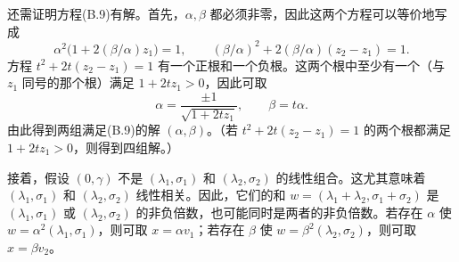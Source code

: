 还需证明方程(B.9)有解。首先，$\alpha,\beta$ 都必须非零，因此这两个方程可以等价地写成
\[
 \alpha^2\bigl(1+2(\beta/\alpha)z_1\bigr)=1,\qquad
 (\beta/\alpha)^2+2(\beta/\alpha)(z_2-z_1)=1.
\]
方程 $t^2+2t(z_2-z_1)=1$ 有一个正根和一个负根。这两个根中至少有一个（与 $z_1$ 同号的那个根）满足 $1+2tz_1>0$，因此可取
\[
 \alpha=\frac{\pm1}{\sqrt{1+2tz_1}},\qquad\beta=t\alpha.
\]
由此得到两组满足(B.9)的解 $(\alpha,\beta)$。（若 $t^2+2t(z_2-z_1)=1$ 的两个根都满足 $1+2tz_1>0$，则得到四组解。）

接着，假设 $(0,\gamma)$ 不是 $(\lambda_1,\sigma_1)$ 和 $(\lambda_2,\sigma_2)$ 的线性组合。这尤其意味着 $(\lambda_1,\sigma_1)$ 和 $(\lambda_2,\sigma_2)$ 线性相关。因此，它们的和 $w=(\lambda_1+\lambda_2,\sigma_1+\sigma_2)$ 是 $(\lambda_1,\sigma_1)$ 或 $(\lambda_2,\sigma_2)$ 的非负倍数，也可能同时是两者的非负倍数。若存在 $\alpha$ 使 $w=\alpha^2(\lambda_1,\sigma_1)$，则可取 $x=\alpha v_1$；若存在 $\beta$ 使 $w=\beta^2(\lambda_2,\sigma_2)$，则可取 $x=\beta v_2$。

